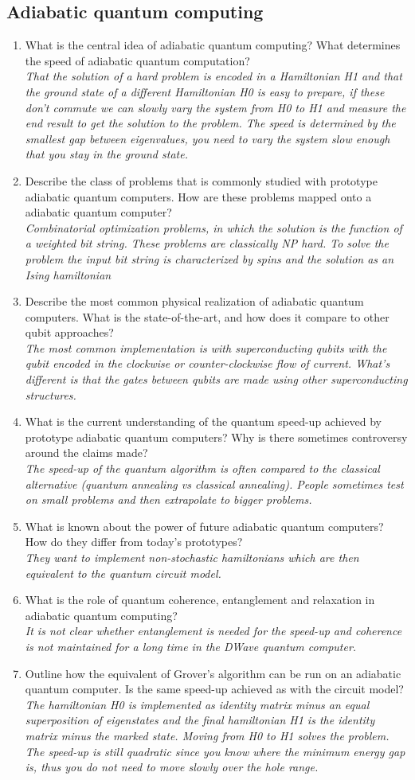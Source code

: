 \documentclass[a4paper]{scrartcl}
\newcommand{\qa}[2]{#1\\ \textit{#2}}
\begin{document}
\subsection*{Adiabatic quantum computing}
\begin{enumerate}
\item \qa{What is the central idea of adiabatic quantum computing? What determines the speed of adiabatic quantum computation?}{That the solution of a hard problem is encoded in a Hamiltonian H1 and that the ground state of a different Hamiltonian H0 is easy to prepare, if these don't commute we can slowly vary the system from H0 to H1 and measure the end result to get the solution to the problem. The speed is determined by the smallest gap between eigenvalues, you need to vary the system slow enough that you stay in the ground state.}
\item \qa{Describe the class of problems that is commonly studied with prototype adiabatic quantum computers. How are these problems mapped onto a adiabatic quantum computer?}{Combinatorial optimization problems, in which the solution is the function of a weighted bit string. These problems are classically NP hard. To solve the problem the input bit string is characterized by spins and the solution as an Ising hamiltonian}
\item \qa{Describe the most common physical realization of adiabatic quantum computers. What is the state-of-the-art, and how does it compare to other qubit approaches?}{The most common implementation is with superconducting qubits with the qubit encoded in the clockwise or counter-clockwise flow of current. What's different is that the gates between qubits are made using other superconducting structures.}
\item \qa{What is the current understanding of the quantum speed-up achieved by prototype adiabatic quantum computers? Why is there sometimes controversy around the claims made?}{The speed-up of the quantum algorithm is often compared to the classical alternative (quantum annealing vs classical annealing). People sometimes test on small problems and then extrapolate to bigger problems.}
\item \qa{What is known about the power of future adiabatic quantum computers? How do they differ from today's prototypes?}{They want to implement non-stochastic hamiltonians which are then equivalent to the quantum circuit model.}
\item \qa{What is the role of quantum coherence, entanglement and relaxation in adiabatic quantum computing?}{It is not clear whether entanglement is needed for the speed-up and coherence is not maintained for a long time in the DWave quantum computer.}
\item \qa{Outline how the equivalent of Grover's algorithm can be run on an adiabatic quantum computer. Is the same speed-up achieved as with the circuit model? }{The hamiltonian H0 is implemented as identity matrix minus an equal superposition of eigenstates and the final hamiltonian H1 is the identity matrix minus the marked state. Moving from H0 to H1 solves the problem. The speed-up is still quadratic since you know where the minimum energy gap is, thus you do not need to move slowly over the hole range.}


\end{enumerate}
\end{document}
